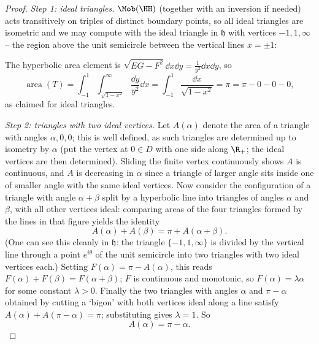 \begin{proof}
    \emph{Step 1: ideal triangles.} $\Mob(\HH)$ (together with an inversion if needed) acts transitively on triples of distinct boundary points, so all ideal triangles are isometric and we may compute with the ideal triangle in $\mathfrak{h}$ with vertices $-1, 1, \infty$ -- the region above the unit semicircle between the vertical lines $x = \pm 1$:
    \begin{center}
    \end{center}
    The hyperbolic area element is $\sqrt{EG - F^2} \dd x \dd y = \frac{1}{y^2} \dd x \dd y$, so
    $$
    \operatorname{area}(T) = \int_{-1}^1 \int_{\sqrt{1 - x^2}}^{\infty} \frac{\dd y}{y^2} \dd x = \int_{-1}^1 \frac{\dd x}{\sqrt{1 - x^2}} = \pi = \pi - 0 - 0 - 0,
    $$
    as claimed for ideal triangles.

    \emph{Step 2: triangles with two ideal vertices.} Let $A(\alpha)$ denote the area of a triangle with angles $\alpha, 0, 0$; this is well defined, as such triangles are determined up to isometry by $\alpha$ (put the vertex at $0 \in D$ with one side along $\R_+$; the ideal vertices are then determined). Sliding the finite vertex continuously shows $A$ is continuous, and $A$ is decreasing in $\alpha$ since a triangle of larger angle sits inside one of smaller angle with the same ideal vertices. Now consider the configuration of a triangle with angle $\alpha + \beta$ split by a hyperbolic line into triangles of angles $\alpha$ and $\beta$, with all other vertices ideal: comparing areas of the four triangles formed by the lines in that figure yields the identity
    $$
    A(\alpha) + A(\beta) = \pi + A(\alpha + \beta).
    $$
    (One can see this cleanly in $\mathfrak{h}$: the triangle $\{-1, 1, \infty\}$ is divided by the vertical line through a point $e^{i\theta}$ of the unit semicircle into two triangles with two ideal vertices each.) Setting $F(\alpha) = \pi - A(\alpha)$, this reads $F(\alpha) + F(\beta) = F(\alpha + \beta)$; $F$ is continuous and monotonic, so $F(\alpha) = \lambda \alpha$ for some constant $\lambda > 0$. Finally the two triangles with angles $\alpha$ and $\pi - \alpha$ obtained by cutting a `bigon' with both vertices ideal along a line satisfy $A(\alpha) + A(\pi - \alpha) = \pi$; substituting gives $\lambda = 1$. So
    $$
    A(\alpha) = \pi - \alpha.
    $$


\end{proof}
